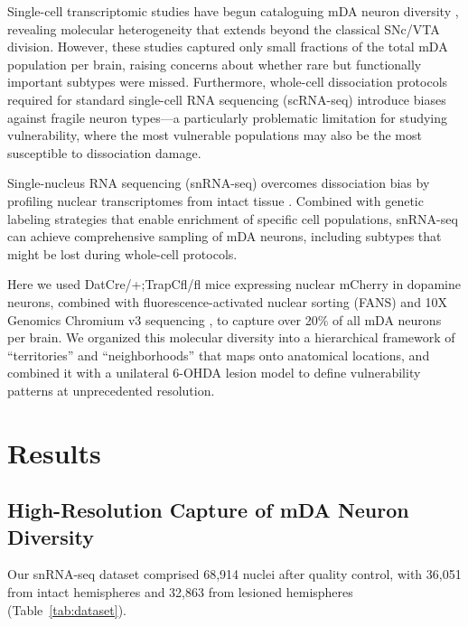 \documentclass[11pt]{article}
\begin{document}
Single-cell transcriptomic studies have begun cataloguing mDA neuron diversity \citep{poulin2018defining, tiklova2019single, saunders2018molecular}, revealing molecular heterogeneity that extends beyond the classical SNc/VTA division. However, these studies captured only small fractions of the total mDA population per brain, raising concerns about whether rare but functionally important subtypes were missed. Furthermore, whole-cell dissociation protocols required for standard single-cell RNA sequencing (scRNA-seq) introduce biases against fragile neuron types---a particularly problematic limitation for studying vulnerability, where the most vulnerable populations may also be the most susceptible to dissociation damage.

Single-nucleus RNA sequencing (snRNA-seq) overcomes dissociation bias by profiling nuclear transcriptomes from intact tissue \citep{fans_method2019}. Combined with genetic labeling strategies that enable enrichment of specific cell populations, snRNA-seq can achieve comprehensive sampling of mDA neurons, including subtypes that might be lost during whole-cell protocols.

Here we used DatCre/+;TrapCfl/fl mice expressing nuclear mCherry in dopamine neurons, combined with fluorescence-activated nuclear sorting (FANS) and 10X Genomics Chromium v3 sequencing \citep{10x_chromium2019}, to capture over 20\% of all mDA neurons per brain. We organized this molecular diversity into a hierarchical framework of ``territories'' and ``neighborhoods'' that maps onto anatomical locations, and combined it with a unilateral 6-OHDA lesion model to define vulnerability patterns at unprecedented resolution.

\section{Results}

\subsection{High-Resolution Capture of mDA Neuron Diversity}

Our snRNA-seq dataset comprised 68,914 nuclei after quality control, with 36,051 from intact hemispheres and 32,863 from lesioned hemispheres (Table~\ref{tab:dataset}).
\end{document}

